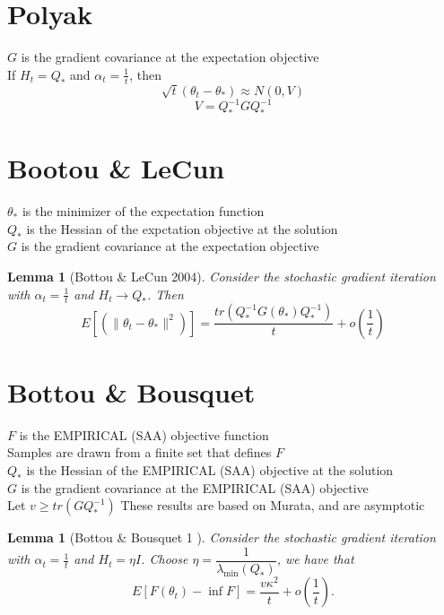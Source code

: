 \documentclass[12pt]{article}
\newtheorem{lem}[theorem]{Lemma}
\begin{document}
		\section{Polyak}

		$G$ is the gradient covariance at the expectation objective \\
		 If $H_t = Q_\ast$ and  $\alpha_t = \frac{1}{t}$, then 
		\begin{equation}
		 	\sqrt{t} (\theta_t - \theta_\ast)  \approx N(0,V)
		\end{equation}
		\begin{equation}
			V = Q_\ast^{-1} G Q_\ast^{-1}
		\end{equation}
		
	\section{Bootou \& LeCun}
	$\theta_\ast$ is the minimizer of the expectation function \\
	$Q_\ast$ is the Hessian of the expctation objective at the solution \\
	$G$ is the gradient covariance at the expectation objective \\
	\begin{lem}[Bottou \& LeCun 2004]
		Consider the stochastic gradient iteration with $\alpha_t = \frac{1}{t}$ and $H_t \rightarrow Q_\ast$. Then
		\[
			E[(\|\theta_t-\theta_\ast\|^2)] = \frac{tr(Q_\ast^{-1}G(\theta_\ast)Q_\ast^{-1})}{t} + o(\frac{1}{t})
		\]
	\end{lem}
	
	
	\section{Bottou \& Bousquet}
	$F$ is the EMPIRICAL (SAA) objective function\\
	Samples are drawn from a finite set that defines $F$\\
	$Q_\ast$ is the Hessian of the EMPIRICAL (SAA) objective at the solution \\
	$G$ is the gradient covariance at the EMPIRICAL (SAA) objective \\
	Let $v \geq tr(G Q_\ast^{-1})$
	These results are based on Murata, and are asymptotic
	\begin{lem}[Bottou \& Bousquet 1 ]
		 Consider the stochastic gradient iteration with $\alpha_t = \frac{1}{t}$ and $H_t = \eta I$. Choose $\eta = \dfrac{1}{\lambda_{\min}(Q_\ast)}$, we have that
	\[
	 E[F(\theta_t)-\inf F] = \frac{v \kappa^2}{t} + o(\frac{1}{t}).
	\]
	\end{lem}
	
\end{document}
